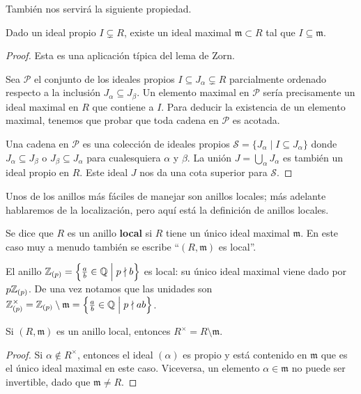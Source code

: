 También nos servirá la siguiente propiedad.

\begin{proposicion}
  Dado un ideal propio $I \subsetneq R$, existe un ideal maximal
  $\mathfrak{m} \subset R$ tal que $I \subseteq \mathfrak{m}$.

  \begin{proof}
    Esta es una aplicación típica del lema de Zorn.

    Sea $\mathcal{P}$ el conjunto de los ideales propios
    $I \subseteq J_\alpha \subsetneq R$ parcialmente ordenado respecto a la
    inclusión $J_\alpha \subseteq J_\beta$. Un elemento maximal en $\mathcal{P}$
    sería precisamente un ideal maximal en $R$ que contiene a $I$. Para deducir
    la existencia de un elemento maximal, tenemos que probar que toda cadena en
    $\mathcal{P}$ es acotada.

    Una cadena en $\mathcal{P}$ es una colección de ideales propios
    $\mathcal{S} = \{ J_\alpha \mid I \subseteq J_\alpha \}$ donde
    $J_\alpha \subseteq J_\beta$ o $J_\beta \subseteq J_\alpha$ para
    cualesquiera $\alpha$ y $\beta$. La unión $J = \bigcup_\alpha J_\alpha$ es
    también un ideal propio en $R$. Este ideal $J$ nos da una cota superior para
    $\mathcal{S}$.
  \end{proof}
\end{proposicion}

\iffalse
Unos de los anillos más fáciles de manejar son anillos locales; más adelante
hablaremos de la localización, pero aquí está la definición de anillos locales.

\begin{definicion}
  Se dice que $R$ es un anillo \textbf{local} si $R$ tiene un único ideal
  maximal $\mathfrak{m}$. En este caso muy a menudo también se escribe
  ``$(R,\mathfrak{m})$ es local''.
\end{definicion}

\begin{ejemplo}
  El anillo
  $\mathbb{Z}_{(p)} = \Bigl\{ \frac{a}{b} \in \mathbb{Q} \Bigm| p\nmid b \Bigr\}$
  es local: su único ideal maximal viene dado por $p\mathbb{Z}_{(p)}$.
  De una vez notamos que las unidades son
  $\mathbb{Z}_{(p)}^\times = \mathbb{Z}_{(p)}\setminus\mathfrak{m} = \Bigl\{ \frac{a}{b} \in \mathbb{Q} \Bigm| p\nmid ab \Bigr\}$.
\end{ejemplo}

\begin{proposicion}
  Si $(R, \mathfrak{m})$ es un anillo local, entonces
  $R^\times = R\setminus \mathfrak{m}$.

  \begin{proof}
    Si $\alpha \notin R^\times$, entonces el ideal $(\alpha)$ es propio
    y está contenido en $\mathfrak{m}$ que es el único ideal maximal en este
    caso. Viceversa, un elemento $\alpha \in \mathfrak{m}$ no puede ser
    invertible, dado que $\mathfrak{m} \ne R$.
  \end{proof}
\end{proposicion}

